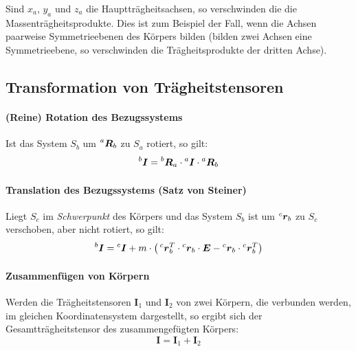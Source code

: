 \documentclass[a4paper, 11pt, accentcolor = tud3b]{tudreport}
\newcommand{\inreferenceto}[2]{\prescript{#1}{}{#2}}
\newcommand{\mat}[1]{\boldsymbol{#1}}
\renewcommand{\vec}[1]{\boldsymbol{#1}}
\begin{document}
			Sind \(x_a\), \(y_a\) und \(z_a\) die Hauptträgheitsachsen, so verschwinden die die Massenträgheitsprodukte. Dies ist zum Beispiel der Fall, wenn die Achsen paarweise Symmetrieebenen des Körpers bilden (bilden zwei Achsen eine Symmetrieebene, so verschwinden die Trägheitsprodukte der dritten Achse).
			
			\subsection{Transformation von Trägheitstensoren}
				\paragraph{(Reine) Rotation des Bezugssystems}
				Ist das System \(S_b\) um \(\inreferenceto{a}{\mat{R}}_b\) zu \(S_a\) rotiert, so gilt:
				\begin{equation*}
					\inreferenceto{b}{\mat{I}} = \inreferenceto{b}{\mat{R}}_a \cdot \inreferenceto{a}{\mat{I}} \cdot \inreferenceto{a}{\mat{R}}_b
				\end{equation*}
				
				\paragraph{Translation des Bezugssystems (Satz von Steiner)}
				Liegt \(S_c\) im \emph{Schwerpunkt} des Körpers und das System \(S_b\) ist um \(\inreferenceto{c}{\vec{r}_b}\) zu \(S_c\) verschoben, aber nicht rotiert, so gilt:
				\begin{equation*}
					\inreferenceto{b}{\mat{I}} = \inreferenceto{c}{\mat{I}} + m \cdot \big( \inreferenceto{c}{\vec{r}}_b^T \cdot \inreferenceto{c}{\vec{r}}_b \cdot \mat{E} - \inreferenceto{c}{\vec{r}}_b \cdot \inreferenceto{c}{\vec{r}}_b^T \big)
				\end{equation*}
				
				\paragraph{Zusammenfügen von Körpern}
				Werden die Trägheitstensoren \( \mat{I}_1 \) und \( \mat{I}_2 \) von zwei Körpern, die verbunden werden, im gleichen Koordinatensystem dargestellt, so ergibt sich der Gesamtträgheitstensor des zusammengefügten Körpers:
				\begin{equation*}
					\mat{I} = \mat{I}_1 + \mat{I}_2
				\end{equation*}
\end{document}
